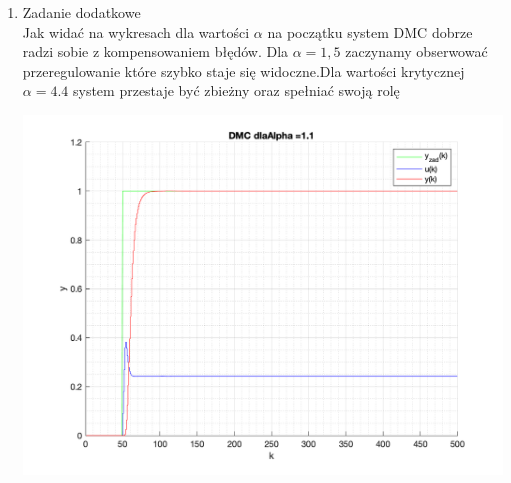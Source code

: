 \documentclass[a4paper, 11pt]{article}
\begin{document}
\begin{enumerate}
\begin{itemize}
\end{itemize}
\item Zadanie dodatkowe\\
Jak widać na wykresach dla wartości \( \alpha\) na początku system DMC dobrze radzi sobie z kompensowaniem błędów. Dla  \( \alpha = 1,5 \) zaczynamy obserwować przeregulowanie które szybko staje się widoczne.Dla wartości krytycznej  \( \alpha = 4.4 \) system przestaje być zbieżny oraz spełniać swoją rolę
 
 \includegraphics[width=\linewidth]{./ModelsDodatkowe_Alpha/P4_DMC_Alpha_1_1_png.png} 
 

\end{enumerate}
\end{document}
